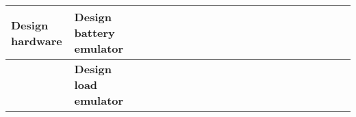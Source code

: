 \begin{table}[ht]
\begin{tabular}{ll|llllllllllllllllllll|}
    \multicolumn{1}{|l|}{\cellcolor[HTML]{38FFF8}\textbf{Design hardware}} & \cellcolor[HTML]{38FFF8}\textbf{Design battery emulator}                                                             & \multicolumn{1}{l|}{}                                   & \multicolumn{1}{l|}{}                                   & \multicolumn{1}{l|}{}                                   & \multicolumn{1}{l|}{}                                   & \multicolumn{1}{l|}{}                                   & \multicolumn{1}{l|}{\cellcolor[HTML]{F8A102}}                                   & \multicolumn{1}{l|}{\cellcolor[HTML]{F8A102}}           & \multicolumn{1}{l|}{\cellcolor[HTML]{F8A102}}           & \multicolumn{1}{l|}{\cellcolor[HTML]{F8A102}}           & \multicolumn{1}{l|}{\cellcolor[HTML]{F8A102}}            & \multicolumn{1}{l|}{\cellcolor[HTML]{F8A102}}            & \multicolumn{1}{l|}{\cellcolor[HTML]{F8A102}}            & \multicolumn{1}{l|}{}                                    & \multicolumn{1}{l|}{}                                    & \multicolumn{1}{l|}{}                                    & \multicolumn{1}{l|}{}                                    & \multicolumn{1}{l|}{}                                    & \multicolumn{1}{l|}{}                                    & \multicolumn{1}{l|}{}                                    &             \\ \hline
    \multicolumn{1}{|l|}{\cellcolor[HTML]{38FFF8}\textbf{}}                & \cellcolor[HTML]{38FFF8}\textbf{Design load emulator}                                                                & \multicolumn{1}{l|}{}                                   & \multicolumn{1}{l|}{}                                   & \multicolumn{1}{l|}{}                                   & \multicolumn{1}{l|}{}                                   & \multicolumn{1}{l|}{}                                   & \multicolumn{1}{l|}{\cellcolor[HTML]{F8A102}}                                   & \multicolumn{1}{l|}{\cellcolor[HTML]{F8A102}}           & \multicolumn{1}{l|}{\cellcolor[HTML]{F8A102}}           & \multicolumn{1}{l|}{\cellcolor[HTML]{F8A102}}           & \multicolumn{1}{l|}{\cellcolor[HTML]{F8A102}}            & \multicolumn{1}{l|}{\cellcolor[HTML]{F8A102}}            & \multicolumn{1}{l|}{\cellcolor[HTML]{F8A102}}            & \multicolumn{1}{l|}{}                                    & \multicolumn{1}{l|}{}                                    & \multicolumn{1}{l|}{}                                    & \multicolumn{1}{l|}{}                                    & \multicolumn{1}{l|}{}                                    & \multicolumn{1}{l|}{}                                    & \multicolumn{1}{l|}{}                                    &             \\ \hline

\end{tabular}
\end{table}
